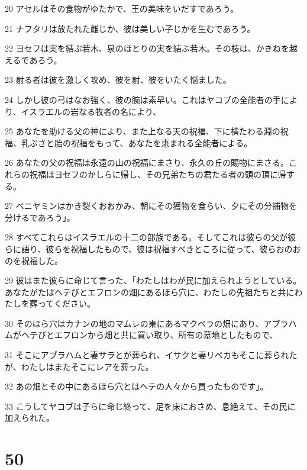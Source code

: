 \par 20 アセルはその食物がゆたかで、王の美味をいだすであろう。
\par 21 ナフタリは放たれた雌じか、彼は美しい子じかを生むであろう。
\par 22 ヨセフは実を結ぶ若木、泉のほとりの実を結ぶ若木。その枝は、かきねを越えるであろう。
\par 23 射る者は彼を激しく攻め、彼を射、彼をいたく悩ました。
\par 24 しかし彼の弓はなお強く、彼の腕は素早い。これはヤコブの全能者の手により、イスラエルの岩なる牧者の名により、
\par 25 あなたを助ける父の神により、また上なる天の祝福、下に横たわる淵の祝福、乳ぶさと胎の祝福をもって、あなたを恵まれる全能者による。
\par 26 あなたの父の祝福は永遠の山の祝福にまさり、永久の丘の賜物にまさる。これらの祝福はヨセフのかしらに帰し、その兄弟たちの君たる者の頭の頂に帰する。
\par 27 ベニヤミンはかき裂くおおかみ、朝にその獲物を食らい、夕にその分捕物を分けるであろう」。
\par 28 すべてこれらはイスラエルの十二の部族である。そしてこれは彼らの父が彼らに語り、彼らを祝福したもので、彼は祝福すべきところに従って、彼らおのおのを祝福した。
\par 29 彼はまた彼らに命じて言った、「わたしはわが民に加えられようとしている。あなたがたはヘテびとエフロンの畑にあるほら穴に、わたしの先祖たちと共にわたしを葬ってください。
\par 30 そのほら穴はカナンの地のマムレの東にあるマクペラの畑にあり、アブラハムがヘテびとエフロンから畑と共に買い取り、所有の墓地としたもので、
\par 31 そこにアブラハムと妻サラとが葬られ、イサクと妻リベカもそこに葬られたが、わたしはまたそこにレアを葬った。
\par 32 あの畑とその中にあるほら穴とはヘテの人々から買ったものです」。
\par 33 こうしてヤコブは子らに命じ終って、足を床におさめ、息絶えて、その民に加えられた。

\chapter{50}

